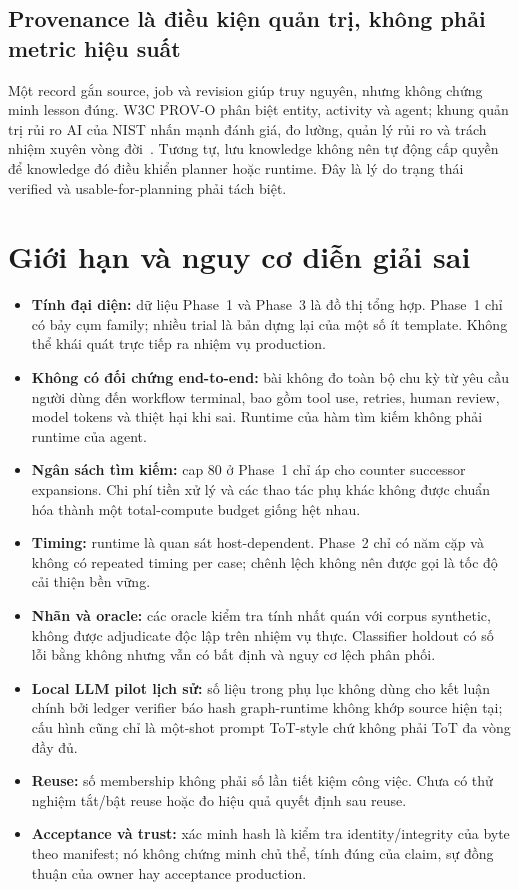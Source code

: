 \documentclass[11pt,a4paper]{article}
\begin{document}
\subsection{Provenance là điều kiện quản trị, không phải metric hiệu suất}
Một record gắn source, job và revision giúp truy nguyên, nhưng không chứng minh lesson đúng. W3C PROV-O phân biệt entity, activity và agent; khung quản trị rủi ro AI của NIST nhấn mạnh đánh giá, đo lường, quản lý rủi ro và trách nhiệm xuyên vòng đời \,\cite{w3cprovo,nistairmf2023,nistgenai2024}. Tương tự, lưu knowledge không nên tự động cấp quyền để knowledge đó điều khiển planner hoặc runtime. Đây là lý do trạng thái verified và usable-for-planning phải tách biệt.

\section{Giới hạn và nguy cơ diễn giải sai}
\begin{itemize}
\item \textbf{Tính đại diện:} dữ liệu Phase~1 và Phase~3 là đồ thị tổng hợp. Phase~1 chỉ có bảy cụm family; nhiều trial là bản dựng lại của một số ít template. Không thể khái quát trực tiếp ra nhiệm vụ production.
\item \textbf{Không có đối chứng end-to-end:} bài không đo toàn bộ chu kỳ từ yêu cầu người dùng đến workflow terminal, bao gồm tool use, retries, human review, model tokens và thiệt hại khi sai. Runtime của hàm tìm kiếm không phải runtime của agent.
\item \textbf{Ngân sách tìm kiếm:} cap 80 ở Phase~1 chỉ áp cho counter successor expansions. Chi phí tiền xử lý và các thao tác phụ khác không được chuẩn hóa thành một total-compute budget giống hệt nhau.
\item \textbf{Timing:} runtime là quan sát host-dependent. Phase~2 chỉ có năm cặp và không có repeated timing per case; chênh lệch không nên được gọi là tốc độ cải thiện bền vững.
\item \textbf{Nhãn và oracle:} các oracle kiểm tra tính nhất quán với corpus synthetic, không được adjudicate độc lập trên nhiệm vụ thực. Classifier holdout có số lỗi bằng không nhưng vẫn có bất định và nguy cơ lệch phân phối.
\item \textbf{Local LLM pilot lịch sử:} số liệu trong phụ lục không dùng cho kết luận chính bởi ledger verifier báo hash graph-runtime không khớp source hiện tại; cấu hình cũng chỉ là một-shot prompt ToT-style chứ không phải ToT đa vòng đầy đủ.
\item \textbf{Reuse:} số membership không phải số lần tiết kiệm công việc. Chưa có thử nghiệm tắt/bật reuse hoặc đo hiệu quả quyết định sau reuse.
\item \textbf{Acceptance và trust:} xác minh hash là kiểm tra identity/integrity của byte theo manifest; nó không chứng minh chủ thể, tính đúng của claim, sự đồng thuận của owner hay acceptance production.
\end{itemize}
\end{document}
